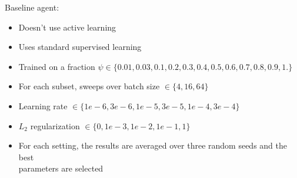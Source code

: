 \documentclass[preview]{standalone}
\begin{document}
\begin{center}
Baseline agent:
            \begin{itemize}
                \item Doesn't use active learning
                \item Uses standard supervised learning
                \item Trained on a fraction $\psi \in \{0.01, 0.03, 0.1, 0.2, 0.3, 0.4, 0.5, 0.6, 0.7, 0.8, 0.9, 1.\}$
                \item For each subset, sweeps over batch size $\in \{4, 16, 64\}$
                \item Learning rate $\in \{1e-6, 3e-6, 1e-5, 3e-5, 1e-4, 3e-4\}$
                \item $L_2$ regularization $\in \{0, 1e-3, 1e-2, 1e-1, 1\}$
                \item For each setting, the results are averaged over three random seeds and the best \\ parameters are selected
            \end{itemize}
\end{center}
\end{document}
